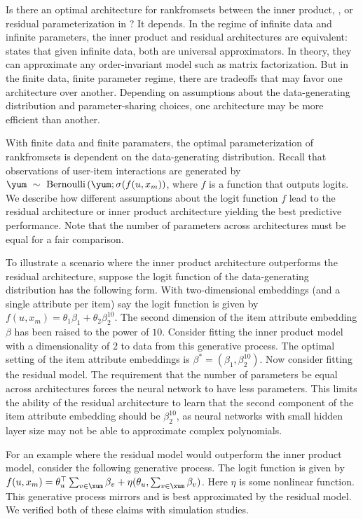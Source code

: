 Is there an optimal architecture for \acrshort{rankfromsets} between the inner
product, , or residual parameterization in
? It depends. In the regime of infinite data and infinite
parameters, the inner product and residual architectures are equivalent:
 states that given infinite data, both are universal approximators.
In theory, they can approximate any order-invariant model such as matrix
factorization. But in the finite data, finite parameter regime, there are
tradeoffs that may favor one architecture over another. Depending on assumptions
about the data-generating distribution and parameter-sharing choices, one
architecture may be more efficient than another.

With finite data and finite paramaters, the optimal parameterization of
\acrshort{rankfromsets} is dependent on the data-generating distribution. Recall
that observations of user-item interactions are generated by
$ \yum~\sim~\textrm{Bernoulli}\left(\yum; \sigma(f(u, x_m)\right)$, where $f$ is
a function that outputs logits. We describe how different assumptions about the
logit function $f$ lead to the residual architecture or inner product
architecture yielding the best predictive performance. Note that the number of
parameters across architectures must be equal for a fair comparison.

To illustrate a scenario where the inner product architecture outperforms the
residual architecture, suppose the logit function of the data-generating
distribution has the following form. With two-dimensional embeddings (and a
single attribute per item) say the logit function is given by
$f(u, x_m) = \theta_1\beta_1 + \theta_2\beta_2^{10}$. The second dimension of
the item attribute embedding $\beta$ has been raised to the power of $10$.
Consider fitting the inner product model with a dimensionality of $2$ to data
from this generative process. The optimal setting of the item attribute
embeddings is $\beta^* = (\beta_1, \beta_2^{10})$. Now consider fitting the
residual model. The requirement that the number of parameters be equal across
architectures forces the neural network to have less parameters. This limits the
ability of the residual architecture to learn that the second component of the
item attribute embedding should be $\beta_2^{10}$, as neural networks with small
hidden layer size may not be able to approximate complex polynomials.

For an example where the residual model would outperform the inner product
model, consider the following generative process. The logit function is given by
$f(u, x_m) = \theta_u^\top \sum_{v\in \xum}\beta_v + \eta(\theta_u, \sum_{v\in
  \xum} \beta_v)$. Here $\eta$ is some nonlinear function. This generative
process mirrors  and is best approximated by the residual
model. We verified both of these claims with simulation studies.

